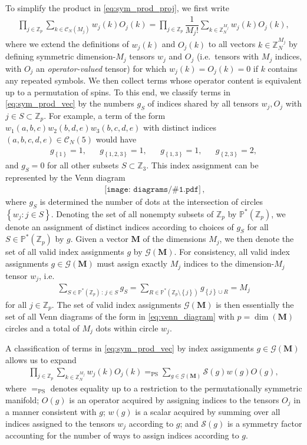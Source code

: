 \documentclass[nofootinbib,notitlepage,11pt]{revtex4-2}
\newcommand{\f}[2]{\dfrac{#1}{#2}} %
\newcommand{\p}[1]{\left(#1\right)} %
\renewcommand{\set}[1]{\left\{#1\right\}} %
\newcommand{\m}{\bm} %
\newcommand{\1}{\mathds{1}}
\newcommand{\C}{\mathcal{C}}
\newcommand{\G}{\mathcal{G}}
\renewcommand{\S}{\mathcal{S}}
\newcommand{\PP}{\mathbb{P}}
\newcommand{\ZZ}{\mathbb{Z}}
\newcommand{\EQPS}{=_{\text{PS}}}
\newcommand{\diagram}[1]
{\,\texttt{[image: diagrams/\#1.pdf]}\,}
\begin{document}
To simplify the product in \eqref{eq:sym_prod_proj}, we first write
\begin{align}
  \prod_{j\in\ZZ_p} \sum_{k\in\C_N\p{M_j}} w_j\p{k} O_j\p{k}
  = \prod_{j\in\ZZ_p} \f1{M_j!} \sum_{k\in\ZZ_N^{M_j}}
  w_j\p{k} O_j\p{k},
  \label{eq:sym_prod_vec}
\end{align}
where we extend the definitions of $w_j\p{k}$ and $O_j\p{k}$ to all
vectors $k\in\ZZ_N^{M_j}$ by defining symmetric dimension-$M_j$
tensors $w_j$ and $O_j$ (i.e.~tensors with $M_j$ indices, with $O_j$
an {\it operator-valued} tensor) for which $w_j\p{k}=O_j\p{k}=0$ if
$k$ contains any repeated symbols.  We then collect terms whose
operator content is equivalent up to a permutation of spins.  To this
end, we classify terms in \eqref{eq:sym_prod_vec} by the numbers $g_S$
of indices shared by all tensors $w_j,O_j$ with $j\in S\subset\ZZ_p$.
For example, a term of the form
$w_1\p{a,b,c} w_2\p{b,d,e} w_3\p{b,c,d,e}$ with distinct indices
$\p{a,b,c,d,e}\in\C_N\p{5}$ would have
\begin{align}
  g_{\set{1}} = 1,
  &&
  g_{\set{1,2,3}} = 1,
  &&
  g_{\set{1,3}} = 1,
  &&
  g_{\set{2,3}} = 2,
\end{align}
and $g_S=0$ for all other subsets $S\subset\ZZ_3$.  This index
assignment can be represented by the Venn diagram
\begin{align}
  \diagram{example_123},
  \label{eq:venn_diagram}
\end{align}
where $g_S$ is determined the number of dots at the intersection of
circles $\set{w_j:j\in S}$.  Denoting the set of all nonempty subsets
of $\ZZ_p$ by $\PP^*\p{\ZZ_p}$, we denote an assignment of distinct
indices according to choices of $g_S$ for all $S\in\PP^*\p{\ZZ_p}$ by
$g$.  Given a vector $\m M$ of the dimensions $M_j$, we then denote
the set of all valid index assignments $g$ by $\G\p{\m M}$.  For
consistency, all valid index assignments $g\in\G\p{\m M}$ must assign
exactly $M_j$ indices to the dimension-$M_j$ tensor $w_j$, i.e.~
\begin{align}
  \sum_{S\in\PP^*\p{\ZZ_p}\,:\,j\in S} g_S
  = \sum_{R\in\PP^*\p{\ZZ_p\setminus\set{j}}} g_{\set{j}\cup R}
  = M_j
\end{align}
for all $j\in\ZZ_p$.  The set of valid index assignments $\G\p{\m M}$
is then essentially the set of all Venn diagrams of the form in
\eqref{eq:venn_diagram} with $p=\dim\p{\m M}$ circles and a total of
$M_j$ dots within circle $w_j$.

A classification of terms in \eqref{eq:sym_prod_vec} by index
assignments $g\in\G\p{\m M}$ allows us to expand
\begin{align}
  \prod_{j\in\ZZ_p} \sum_{k\in\ZZ_N^{M_j}} w_j\p{k} O_j\p{k}
  \EQPS \sum_{g\in\G\p{\m M}} \S\p{g} w\p{g} O\p{g},
  \label{eq:sym_prod_group_start}
\end{align}
where $\EQPS$ denotes equality up to a restriction to the
permutationally symmetric manifold; $O\p{g}$ is an operator acquired
by assigning indices to the tensors $O_j$ in a manner consistent with
$g$; $w\p{g}$ is a scalar acquired by summing over all indices
assigned to the tensors $w_j$ according to $g$; and $\S\p{g}$ is a
symmetry factor accounting for the number of ways to assign indices
according to $g$.
\end{document}
